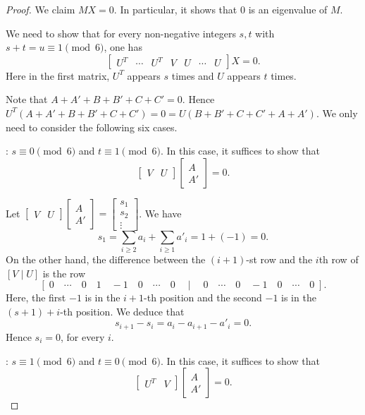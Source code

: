 \documentclass[11pt,a4paper]{amsart}
\theoremstyle{definition}
\numberwithin{equation}{section}
\newcommand{\A}{\mathbb{A}}
\newcommand{\s}{\text{ss}}
\begin{document}
\begin{proof}
We claim  $MX=0$. In particular, it shows that $0$ is an eigenvalue of $M$.

We need to show that for every non-negative integers $s,t$ with $s+t=u\equiv 1\pmod 6$, one has
\[
\begin{bmatrix}
    U^T & \cdots &U^T & V &U&\cdots & U
\end{bmatrix} X =0.
\]
Here in the first matrix,  $U^T$ appears $s$ times and $U$ appears $t$ times.

Note that $A+A'+B+B'+C+C'=0$. Hence $U^T(A+A'+B+B'+C+C')=0=U(B+B'+C+C'+A+A')$. We only need to consider the following six cases.

\medskip
{}: $s\equiv 0\pmod 6$ and $t\equiv 1\pmod 6$. In this case, it suffices to show that \[\begin{bmatrix}
    V & U 
\end{bmatrix} \begin{bmatrix}
    A\\A'
\end{bmatrix}=0.\]

Let $\begin{bmatrix}
    V & U 
\end{bmatrix} \begin{bmatrix}
    A\\A'
\end{bmatrix}=\begin{bmatrix}s_1\\s_2\\\vdots\end{bmatrix}$. We have
\[
s_1=\sum_{i\geq 2}a_i+ \sum_{i\geq 1}a'_i= 1+(-1)=0.
\]
On the other hand, the difference between the $(i+1)$-st row and the $i$th row of $[V \mid U]$ is the row
\[
\left [\; 0\quad \cdots\quad 0 \quad 1 \quad -1 \quad 0\quad\cdots \quad 0\quad \mid\quad  0\quad\cdots \quad 0\quad -1\quad 0\quad\cdots \quad 0\;\right].
\]
Here, the first $-1$ is in the $i+1$-th position and the second $-1$ is in the $(s+1)+i$-th position. We deduce that
\[
s_{i+1}-s_i=a_i-a_{i+1}-a'_i=0.
\]
Hence $s_i=0$, for every $i$.


\medskip
{}: $s\equiv 1\pmod 6$ and $t\equiv 0\pmod 6$. In this case, it suffices to show that \[\begin{bmatrix}
    U^T & V 
\end{bmatrix} \begin{bmatrix}
    A\\A'
\end{bmatrix}=0.\]


\end{proof}
\end{document}
